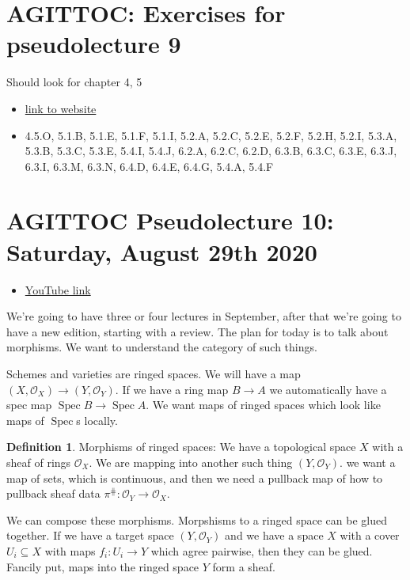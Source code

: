 \documentclass{book}
\renewcommand{\O}{\ensuremath{\mathcal{O}}}
\newcommand{\Spec}{\operatorname{Spec}}
\newcommand{\spec}{\operatorname{Spec}}
\theoremstyle{definition}
\newtheorem{definition}[theorem]{Definition}
\begin{document}
\section{AGITTOC: Exercises for pseudolecture 9}
Should look for chapter 4, 5
\begin{itemize}
\item \href{https://math216.wordpress.com/2017-18-course/#lob}{link to website}
\item 4.5.O, 5.1.B, 5.1.E, 5.1.F, 5.1.I, 5.2.A, 5.2.C, 5.2.E, 5.2.F, 5.2.H, 5.2.I, 5.3.A, 5.3.B, 5.3.C, 5.3.E, 5.4.I, 5.4.J, 6.2.A, 6.2.C, 6.2.D, 6.3.B, 6.3.C, 6.3.E, 6.3.J, 6.3.I, 6.3.M, 6.3.N, 6.4.D, 6.4.E, 6.4.G, 5.4.A, 5.4.F
\end{itemize}

\section{AGITTOC Pseudolecture 10: Saturday, August 29th 2020}

\begin{itemize}
\item \href{https://www.youtube.com/watch?v=ghr-BymTY7c}{YouTube link}
\end{itemize}

We're going to have three or four lectures in September, after that we're going
to have a new edition, starting with a review. The plan for today is to talk
about morphisms. We want to understand the category of such things.

Schemes and varieties are ringed spaces. We will have a map $(X, \O_X) \rightarrow (Y, \O_Y)$.
If we have a ring map $B \rightarrow  A$ we automatically have a spec map
$\Spec B \rightarrow \spec A$. We want maps of ringed spaces which look
like maps of $\Spec$s locally.

\begin{definition}
Morphisms of ringed spaces: We have a topological space $X$ with a sheaf of rings
$\O_X$. We are mapping into another such thing $(Y, \O_Y)$. we want
a map of sets, which is continuous, and then we need a pullback map of
how to pullback sheaf data $\pi^\hash: \O_Y \rightarrow \O_X$. 
\end{definition}

We can compose these morphisms. Morpshisms to a ringed space can be
glued together. If we have a target space $(Y, \O_Y)$ and we have a 
space $X$ with a cover $U_i \subseteq X$ with maps $f_i : U_i \rightarrow Y$ which
agree pairwise, then they can be glued. Fancily put, maps into the ringed space
$Y$ form a sheaf.
\end{document}
